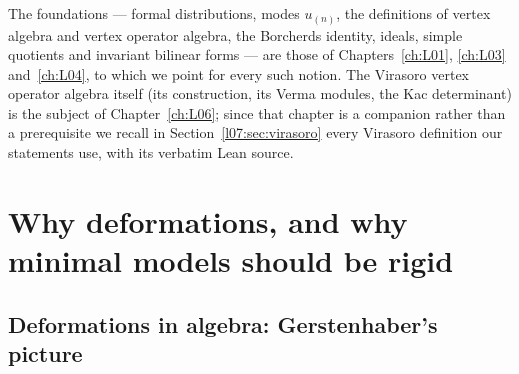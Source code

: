 The foundations --- formal distributions, modes $u_{(n)}$, the definitions of vertex algebra and
vertex operator algebra, the Borcherds identity, ideals, simple quotients and invariant bilinear
forms --- are those of Chapters~\ref{ch:L01}, \ref{ch:L03} and~\ref{ch:L04}, to which we point for every such notion. The Virasoro
vertex operator algebra itself (its construction, its Verma modules, the Kac determinant) is the
subject of Chapter~\ref{ch:L06}; since that chapter is a companion rather than a prerequisite we
recall in Section~\ref{l07:sec:virasoro} every Virasoro definition our statements use, with its
verbatim Lean source.

\section{Why deformations, and why minimal models should be rigid}\label{l07:sec:motivation}

\subsection{Deformations in algebra: Gerstenhaber's picture}


